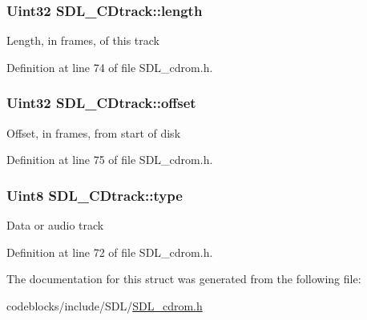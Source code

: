 \hypertarget{structSDL__CDtrack_a15ae81e65a360c3a334e4323af6f2da5}{
\subsubsection[{length}]{\setlength{\rightskip}{0pt plus 5cm}Uint32 S\+D\+L\+\_\+\+C\+Dtrack\+::length}}\label{structSDL__CDtrack_a15ae81e65a360c3a334e4323af6f2da5}
Length, in frames, of this track 

Definition at line 74 of file S\+D\+L\+\_\+cdrom.\+h.

\hypertarget{structSDL__CDtrack_a5c0875650889c529cefee6c2684901f5}{
\subsubsection[{offset}]{\setlength{\rightskip}{0pt plus 5cm}Uint32 S\+D\+L\+\_\+\+C\+Dtrack\+::offset}}\label{structSDL__CDtrack_a5c0875650889c529cefee6c2684901f5}
Offset, in frames, from start of disk 

Definition at line 75 of file S\+D\+L\+\_\+cdrom.\+h.

\hypertarget{structSDL__CDtrack_adc74ef4de78c8418f229e3efd24a076f}{
\subsubsection[{type}]{\setlength{\rightskip}{0pt plus 5cm}Uint8 S\+D\+L\+\_\+\+C\+Dtrack\+::type}}\label{structSDL__CDtrack_adc74ef4de78c8418f229e3efd24a076f}
Data or audio track 

Definition at line 72 of file S\+D\+L\+\_\+cdrom.\+h.



The documentation for this struct was generated from the following file\+:\begin{DoxyCompactItemize}
\item 
codeblocks/include/\+S\+D\+L/\hyperlink{SDL__cdrom_8h}{S\+D\+L\+\_\+cdrom.\+h}\end{DoxyCompactItemize}
